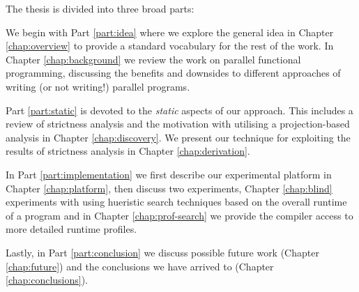The thesis is divided into three broad parts:

We begin with Part \ref{part:idea} where we explore the general idea in Chapter
\ref{chap:overview} to provide a standard vocabulary for the rest of the work.
In Chapter \ref{chap:background} we review the work on parallel functional
programming, discussing the benefits and downsides to different approaches of
writing (or not writing!) parallel programs.

Part \ref{part:static} is devoted to the \emph{static} aspects of our approach.
This includes a review of strictness analysis and the motivation with utilising
a projection-based analysis in Chapter \ref{chap:discovery}. We present our
technique for exploiting the results of strictness analysis in Chapter
\ref{chap:derivation}.

In Part \ref{part:implementation} we first describe our experimental platform
in Chapter \ref{chap:platform}, then discuss two experiments, Chapter
\ref{chap:blind} experiments with using hueristic search techniques based on
the overall runtime of a program and in Chapter \ref{chap:prof-search} we
provide the compiler access to more detailed runtime profiles. 

Lastly, in Part \ref{part:conclusion} we discuss possible future work (Chapter
\ref{chap:future}) and the conclusions we have arrived to (Chapter
\ref{chap:conclusions}).

